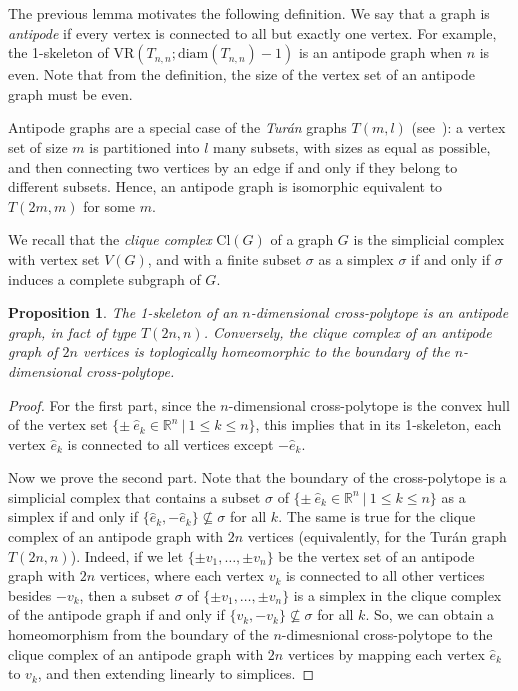 \documentclass[12pt,a4paper]{amsart}
\newtheorem{proposition}[theorem]{Proposition}
\theoremstyle{definition}
\newcommand{\vr}[2]{\mathrm{VR}(#1;#2)}
\newcommand{\cl}{\ensuremath{\mathrm{Cl}}}
\newcommand{\diam}{\ensuremath{\mathrm{diam}}}
\numberwithin{equation}{section}
\begin{document}
The previous lemma motivates the following definition.
We say that a graph is \emph{antipode} if every vertex is connected to all but exactly one vertex.
For example, the 1-skeleton of $\vr{T_{n,n}}{\diam(T_{n,n})-1}$ is an antipode graph when $n$ is even.
Note that from the definition, the size of the vertex set of an antipode graph must be even.

Antipode graphs are a special case of the \emph{Tur\'an} graphs $T(m, l)$ (see~\cite{turan1954theory}): a vertex set of size $m$ is partitioned into $l$ many subsets, with sizes as equal as possible, and then connecting two vertices by an edge if and only if they belong to different subsets.
Hence, an antipode graph is isomorphic equivalent to $T(2m, m)$ for some $m$.

We recall that the \emph{clique complex} $\cl(G)$ of a graph $G$ is the simplicial complex with vertex set $V(G)$, and with a finite subset $\sigma$ as a simplex $\sigma$ if and only if $\sigma$ induces a complete subgraph of $G$.

\begin{proposition}
\label{Proposition:croo-antipode}
The 1-skeleton of an $n$-dimensional cross-polytope is an antipode graph, in fact of type $T(2n,n)$.
Conversely, the clique complex of an antipode graph of $2n$ vertices is toplogically homeomorphic to the boundary of the $n$-dimensional cross-polytope.
\end{proposition}

\begin{proof}
For the first part, since the $n$-dimensional cross-polytope is the convex hull of the vertex set $\{ \pm \ \hat e_k \in \mathbb R^n~|~1\leq k \leq n \}$, this implies that in its 1-skeleton, each vertex $\hat e_k$ is connected to all vertices except $-\hat e_k$.

Now we prove the second part.
Note that the boundary of the cross-polytope is a simplicial complex that contains a subset $\sigma$ of $\{ \pm \ \hat e_k \in \mathbb R^n~|~1\leq k \leq n \}$ as a simplex if and only if $\{\hat e_k,-\hat e_k\}\nsubseteq \sigma$ for all $k$.
%
The same is true for the clique complex of an antipode graph with $2n$ vertices (equivalently, for the Tur\'an graph $T(2n,n)$).
Indeed, if we let $\{\pm v_1,\ldots,\pm v_n\}$ be the vertex set of an antipode graph with $2n$ vertices, where each vertex $v_k$ is connected to all other vertices besides $-v_k$, then a subset $\sigma$ of $\{\pm v_1,\ldots,\pm v_n\}$ is a simplex in the clique complex of the antipode graph if and only if $\{v_k,-v_k\}\nsubseteq \sigma$ for all $k$.
So, we can obtain a homeomorphism from the boundary of the $n$-dimesnional cross-polytope to the clique complex of an antipode graph with $2n$ vertices by mapping each vertex $\hat e_k$ to $v_k$, and then extending linearly to simplices.
\end{proof}
\end{document}
